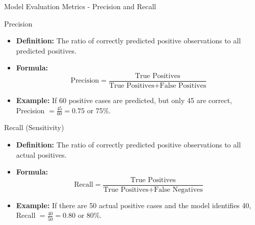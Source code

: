 \documentclass[aspectratio=169]{beamer}
\begin{document}
\begin{frame}[fragile]{Model Evaluation Metrics - Precision and Recall}
    \begin{block}{Precision}
        \begin{itemize}
            \item \textbf{Definition:} The ratio of correctly predicted positive observations to all predicted positives.
            \item \textbf{Formula:}
            \begin{equation}
                \text{Precision} = \frac{\text{True Positives}}{\text{True Positives} + \text{False Positives}}
            \end{equation}
            \item \textbf{Example:} If 60 positive cases are predicted, but only 45 are correct, Precision \( = \frac{45}{60} = 0.75 \) or 75\%.
        \end{itemize}
    \end{block}
    
    \begin{block}{Recall (Sensitivity)}
        \begin{itemize}
            \item \textbf{Definition:} The ratio of correctly predicted positive observations to all actual positives.
            \item \textbf{Formula:}
            \begin{equation}
                \text{Recall} = \frac{\text{True Positives}}{\text{True Positives} + \text{False Negatives}}
            \end{equation}
            \item \textbf{Example:} If there are 50 actual positive cases and the model identifies 40, Recall \( = \frac{40}{50} = 0.80 \) or 80\%.
        \end{itemize}
    \end{block}
\end{frame}
\end{document}
